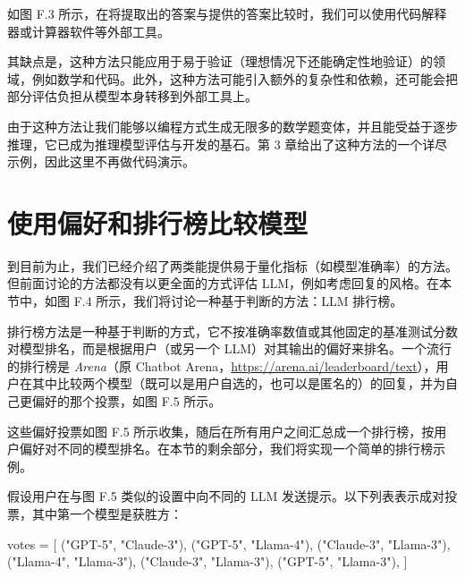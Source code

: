 如图 F.3 所示，在将提取出的答案与提供的答案比较时，我们可以使用代码解释器或计算器软件等外部工具。

其缺点是，这种方法只能应用于易于验证（理想情况下还能确定性地验证）的领域，例如数学和代码。此外，这种方法可能引入额外的复杂性和依赖，还可能会把部分评估负担从模型本身转移到外部工具上。

由于这种方法让我们能够以编程方式生成无限多的数学题变体，并且能受益于逐步推理，它已成为推理模型评估与开发的基石。第 3 章给出了这种方法的一个详尽示例，因此这里不再做代码演示。

\section{使用偏好和排行榜比较模型}

到目前为止，我们已经介绍了两类能提供易于量化指标（如模型准确率）的方法。但前面讨论的方法都没有以更全面的方式评估 LLM，例如考虑回复的风格。在本节中，如图 F.4 所示，我们将讨论一种基于判断的方法：LLM 排行榜。


排行榜方法是一种基于判断的方式，它不按准确率数值或其他固定的基准测试分数对模型排名，而是根据用户（或另一个 LLM）对其输出的偏好来排名。一个流行的排行榜是 \emph{Arena}（原 Chatbot Arena，\href{https://arena.ai/leaderboard/text}{https://arena.ai/leaderboard/text}），用户在其中比较两个模型（既可以是用户自选的，也可以是匿名的）的回复，并为自己更偏好的那个投票，如图 F.5 所示。


这些偏好投票如图 F.5 所示收集，随后在所有用户之间汇总成一个排行榜，按用户偏好对不同的模型排名。在本节的剩余部分，我们将实现一个简单的排行榜示例。

假设用户在与图 F.5 类似的设置中向不同的 LLM 发送提示。以下列表表示成对投票，其中第一个模型是获胜方：

\begin{codebox}
votes = [
    ("GPT-5", "Claude-3"),
    ("GPT-5", "Llama-4"),
    ("Claude-3", "Llama-3"),
    ("Llama-4", "Llama-3"),
    ("Claude-3", "Llama-3"),
    ("GPT-5", "Llama-3"),
]
\end{codebox}

